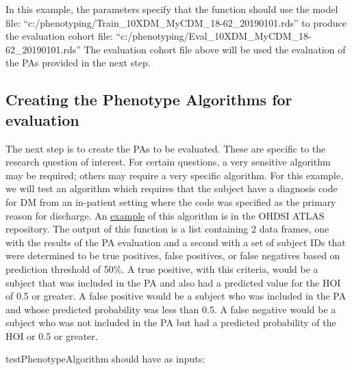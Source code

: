 \documentclass[]{article}
\begin{document}
In this example, the parameters specify that the function should use the
model file: ``c:/phenotyping/Train\_10XDM\_MyCDM\_18-62\_20190101.rds''
to produce the evaluation cohort file:
``c:/phenotyping/Eval\_10XDM\_MyCDM\_18-62\_20190101.rds'' The
evaluation cohort file above will be used the evaluation of the PAs
provided in the next step.

\hypertarget{creating-the-phenotype-algorithms-for-evaluation}{%
\subsection{Creating the Phenotype Algorithms for
evaluation}\label{creating-the-phenotype-algorithms-for-evaluation}}

The next step is to create the PAs to be evaluated. These are specific
to the research question of interest. For certain questions, a very
sensitive algorithm may be required; others may require a very specific
algorithm. For this example, we will test an algorithm which requires
that the subject have a diagnosis code for DM from an in-patient setting
where the code was specified as the primary reason for discharge. An
\href{http://www.ohdsi.org/web/atlas/\#/cohortdefinition/1769702}{example}
of this algorithm is in the OHDSI ATLAS repository. The output of this
function is a list containing 2 data frames, one with the results of the
PA evaluation and a second with a set of subject IDs that were
determined to be true positives, false positives, or false negatives
based on prediction threshold of 50\%. A true positive, with this
criteria, would be a subject that was included in the PA and also had a
predicted value for the HOI of 0.5 or greater. A false positive would be
a subject who was included in the PA and whose predicted probability was
less than 0.5. A false negative would be a subject who was not included
in the PA but had a predicted probability of the HOI or 0.5 or greater.

testPhenotypeAlgorithm should have as inputs:
\end{document}
